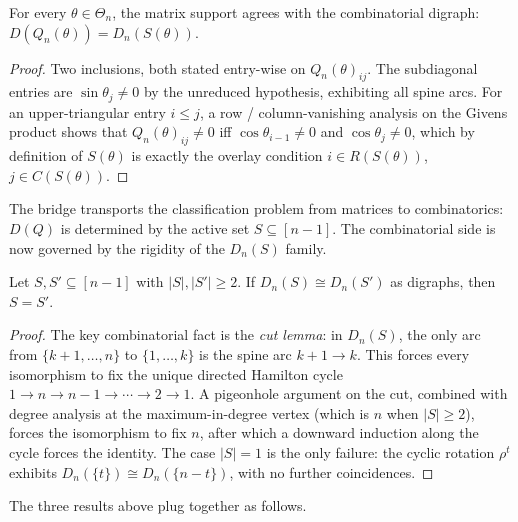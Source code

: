 \begin{theorem}[Bridge]\label{thm:bridge}
  \leanok
  For every $\theta \in \Theta_n$, the matrix support agrees with the
  combinatorial digraph:
  $D(Q_n(\theta)) = D_n(S(\theta))$.
\end{theorem}
\begin{proof}\leanok{}
  Two inclusions, both stated entry-wise on $Q_n(\theta)_{ij}$. The
  subdiagonal entries are $\sin\theta_j \ne 0$ by the unreduced
  hypothesis, exhibiting all spine arcs. For an upper-triangular entry
  $i \le j$, a row / column-vanishing analysis on the Givens product
  shows that $Q_n(\theta)_{ij} \ne 0$ iff $\cos\theta_{i-1} \ne 0$ and
  $\cos\theta_j \ne 0$, which by definition of $S(\theta)$ is exactly
  the overlay condition $i \in R(S(\theta))$, $j \in C(S(\theta))$.
\end{proof}

The bridge transports the classification problem from matrices to
combinatorics: $D(Q)$ is determined by the active set $S \subseteq [n-1]$.
The combinatorial side is now governed by the rigidity of the
$D_n(S)$ family.

\begin{theorem}[Rigidity]\label{thm:rigid}
  \leanok
  Let $S, S' \subseteq [n-1]$ with $|S|, |S'| \ge 2$. If
  $D_n(S) \cong D_n(S')$ as digraphs, then $S = S'$.
\end{theorem}
\begin{proof}\leanok{}
  The key combinatorial fact is the \emph{cut lemma}: in $D_n(S)$, the
  only arc from $\{k{+}1, \dots, n\}$ to $\{1, \dots, k\}$ is the
  spine arc $k{+}1 \to k$. This forces every isomorphism to fix the
  unique directed Hamilton cycle
  $1 \to n \to n{-}1 \to \cdots \to 2 \to 1$. A pigeonhole argument on
  the cut, combined with degree analysis at the maximum-in-degree
  vertex (which is $n$ when $|S| \ge 2$), forces the isomorphism to
  fix $n$, after which a downward induction along the cycle forces the
  identity. The case $|S| = 1$ is the only failure: the cyclic rotation
  $\rho^t$ exhibits $D_n(\{t\}) \cong D_n(\{n - t\})$, with no further
  coincidences.
\end{proof}

The three results above plug together as follows.

